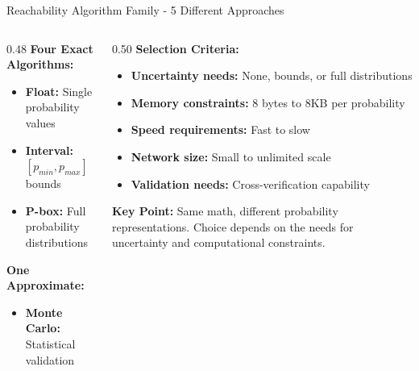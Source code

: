 \documentclass[aspectratio=169]{beamer}
\begin{document}
\begin{frame}{\textcolor{juliapurple}{Reachability Algorithm Family - 5 Different Approaches}}
\begin{columns}
\begin{column}{0.48\textwidth}
\textbf{\textcolor{juliablue}{Four Exact Algorithms:}}
\begin{itemize}
    \item \textbf{Float:} Single probability values
    \item \textbf{Interval:} $[p_{min}, p_{max}]$ bounds
    \item \textbf{P-box:} Full probability distributions  
\end{itemize}

\vspace{0.3cm}
\textbf{\textcolor{juliared}{One Approximate:}}
\begin{itemize}
    \item \textbf{Monte Carlo:} Statistical validation
\end{itemize}
\end{column}

\begin{column}{0.50\textwidth}
\textbf{\textcolor{juliagreen}{Selection Criteria:}}
\begin{itemize}
    \item \textbf{Uncertainty needs:} None, bounds, or full distributions
    \item \textbf{Memory constraints:} 8 bytes to 8KB per probability
    \item \textbf{Speed requirements:} Fast to slow
    \item \textbf{Network size:} Small to unlimited scale
    \item \textbf{Validation needs:} Cross-verification capability
\end{itemize}

\vspace{0.3cm}
\textbf{\textcolor{juliagreen}{Key Point:}}
Same math, different probability representations. Choice depends on the needs for uncertainty and computational constraints.
\end{column}
\end{columns}
\end{frame}
\end{document}
